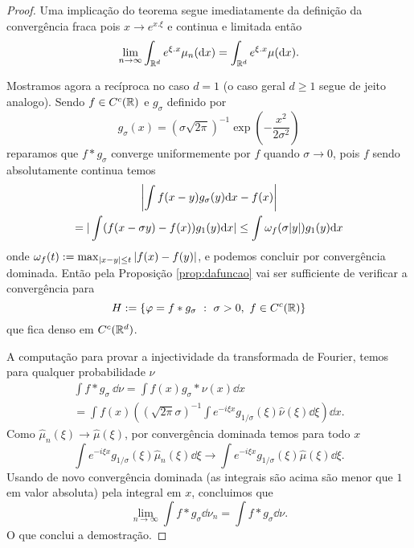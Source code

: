 \begin{proof}
 Uma implicação do teorema segue imediatamente da definição da convergência fraca pois 
 $x \to e^{x.\xi}$ e continua e limitada então 
 \begin{equation}
 \lim_{n\to \infty}\int_{{\mathbb R}^d} e^{\xi.x} \mu_n(\mathrm{d} x)=\int_{{\mathbb R}^d} e^{\xi.x} \mu(\mathrm{d} x).
 \end{equation}

 \medskip
 
 Mostramos agora a recíproca no caso $d=1$ (o caso geral $d\ge 1$ segue de jeito analogo).
 Sendo $f\in C^c({\mathbb R})$ e $g_{\sigma}$ definido por 
 $$ g_{\sigma}(x)=(\sigma \sqrt{2\pi})^{-1} \exp\left(-\frac{x^2}{2\sigma^2}\right) $$
 reparamos que $f\ast g_{\sigma}$ converge uniformemente por $f$ quando $\sigma \to 0$, pois 
 $f$ sendo absolutamente continua temos
 \begin{multline}
  \left |\int f(x-y) g_{\sigma}(y) \mathrm{d} x -f(x) \right|\\
  =   |\int (f(x-\sigma y)-f(x)) g_{1}(y) \mathrm{d} x|
  \le \int \omega_f(\sigma |y|) g_{1}(y) \mathrm{d} x
 \end{multline}
onde $\omega_f(t):= \max_{|x-y|\le t} |f(x)-f(y)|$, e podemos concluir por convergência dominada.
Então pela Proposição \ref{prop:dafuncao} vai ser sufficiente de verificar a convergência para 
$$H:= \{ \varphi=f \ast g_{\sigma}\ : \ \sigma>0, \ f\in C^c({\mathbb R})  \}$$ 
 que fica denso em $C^c({\mathbb R}^d)$.
 
 \medskip
 
 A computação para provar a injectividade da transformada de Fourier, temos para qualquer probabilidade $\nu$
 \begin{multline}
  \int f \ast g_{\sigma} \ \dd \nu= \int f(x) g_{\sigma} \ast \nu(x) \dd x\\
  =\int f(x)  \left( (\sqrt{2\pi} \sigma)^{-1}\int e^{-i\xi x}g_{1/\sigma}(\xi) \hat \nu(\xi) 
  \dd 
  \xi \right) \dd x.
 \end{multline}
Como $\hat \mu_n(\xi) \to \hat \mu(\xi)$, por convergência dominada temos para todo $x$
 $$\int e^{-i\xi x}g_{1/\sigma}(\xi) \hat \mu_n(\xi) 
  \dd 
  \xi  \to \int e^{-i\xi x}g_{1/\sigma}(\xi) \hat \mu(\xi) 
  \dd 
  \xi.$$
  Usando de novo convergência dominada (as integrais são acima são menor que $1$ em valor absoluta) pela integral em $x$, concluimos que 
  \begin{equation}
    \lim_{n\to \infty} \int f \ast g_{\sigma} \dd \nu_n = \int f \ast g_{\sigma} \dd \nu.
  \end{equation}
O que conclui a demostração.
\end{proof}


